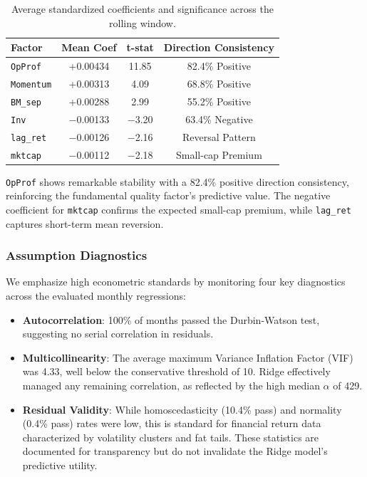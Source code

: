 \documentclass[11pt]{article}
\begin{document}
\begin{table}[H]
\centering
\begin{tabular}{lccc}
\toprule
\textbf{Factor} & \textbf{Mean Coef} & \textbf{t-stat} & \textbf{Direction Consistency} \\
\midrule
\texttt{OpProf}   & +0.00434 & 11.85  & 82.4\% Positive \\
\texttt{Momentum} & +0.00313 & 4.09   & 68.8\% Positive \\
\texttt{BM\_sep}  & +0.00288 & 2.99   & 55.2\% Positive \\
\texttt{Inv}      & $-$0.00133 & $-$3.20  & 63.4\% Negative \\
\texttt{lag\_ret} & $-$0.00126 & $-$2.16  & Reversal Pattern \\
\texttt{mktcap}   & $-$0.00112 & $-$2.18  & Small-cap Premium \\
\bottomrule
\end{tabular}
\caption{Average standardized coefficients and significance across the rolling window.}
\label{tab:ridge_coef_summary}
\end{table}

\texttt{OpProf} shows remarkable stability with a 82.4\% positive direction consistency, reinforcing the fundamental quality factor's predictive value. The negative coefficient for \texttt{mktcap} confirms the expected small-cap premium, while \texttt{lag\_ret} captures short-term mean reversion.

\subsubsection{Assumption Diagnostics}
We emphasize high econometric standards by monitoring four key diagnostics across the evaluated monthly regressions:
\begin{itemize}
    \item \textbf{Autocorrelation}: 100\% of months passed the Durbin-Watson test, suggesting no serial correlation in residuals.
    \item \textbf{Multicollinearity}: The average maximum Variance Inflation Factor (VIF) was 4.33, well below the conservative threshold of 10. Ridge effectively managed any remaining correlation, as reflected by the high median $\alpha$ of 429.
    \item \textbf{Residual Validity}: While homoscedasticity (10.4\% pass) and normality (0.4\% pass) rates were low, this is standard for financial return data characterized by volatility clusters and fat tails. These statistics are documented for transparency but do not invalidate the Ridge model's predictive utility.
\end{itemize}
\end{document}
